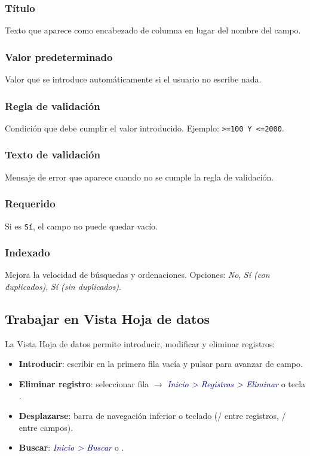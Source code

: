 \documentclass[12pt,a4paper]{article}
\newcommand{\tecla}[1]{\fbox{\small\texttt{#1}}}
\newcommand{\menu}[1]{\textit{\textcolor{darkblue}{#1}}}
\begin{document}
\subsubsection{Título}
Texto que aparece como encabezado de columna en lugar del nombre del campo.

\subsubsection{Valor predeterminado}
Valor que se introduce automáticamente si el usuario no escribe nada.

\subsubsection{Regla de validación}
Condición que debe cumplir el valor introducido. Ejemplo: \texttt{>=100 Y <=2000}.

\subsubsection{Texto de validación}
Mensaje de error que aparece cuando no se cumple la regla de validación.

\subsubsection{Requerido}
Si es \texttt{Sí}, el campo no puede quedar vacío.

\subsubsection{Indexado}
Mejora la velocidad de búsquedas y ordenaciones. Opciones: \emph{No}, \emph{Sí (con duplicados)}, \emph{Sí (sin duplicados)}.

\subsection{Trabajar en Vista Hoja de datos}

La Vista Hoja de datos permite introducir, modificar y eliminar registros:
\begin{itemize}
  \item \textbf{Introducir}: escribir en la primera fila vacía y pulsar \tecla{Intro} para avanzar de campo.
  \item \textbf{Eliminar registro}: seleccionar fila $\rightarrow$ \menu{Inicio > Registros > Eliminar} o tecla \tecla{Supr}.
  \item \textbf{Desplazarse}: barra de navegación inferior o teclado (\tecla{$\uparrow$}/\tecla{$\downarrow$} entre registros, \tecla{$\leftarrow$}/\tecla{$\rightarrow$} entre campos).
  \item \textbf{Buscar}: \menu{Inicio > Buscar} o \tecla{Ctrl+B}.
\end{itemize}
\end{document}
